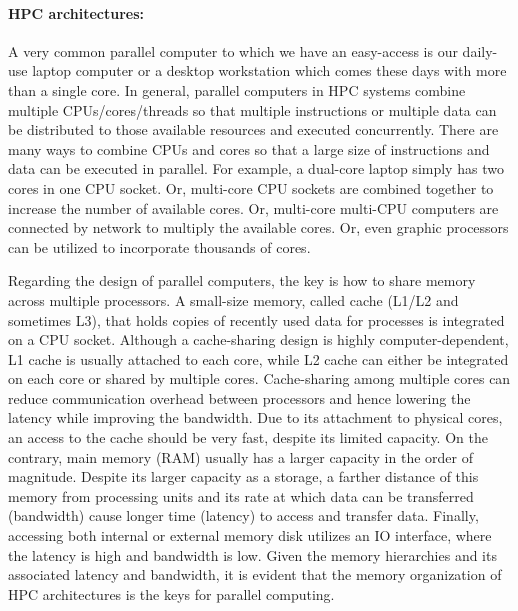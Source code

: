 \documentclass[12pt]{article}
\begin{document}
\paragraph{HPC architectures:} A very common parallel computer to which we have an easy-access is our daily-use laptop computer or a desktop workstation which comes these days with more than a single core. In general, parallel computers in HPC systems combine multiple CPUs/cores/threads so that multiple instructions or multiple data can be distributed to those available resources and executed concurrently. There are many ways to combine CPUs and cores so that a large size of instructions and data can be executed in parallel. For example, a dual-core laptop simply has two cores in one CPU socket. Or, multi-core CPU sockets are combined together to increase the number of available cores. Or, multi-core multi-CPU computers are connected by network to multiply the available cores. Or, even graphic processors can be utilized to incorporate thousands of cores.

Regarding the design of parallel computers, the key is how to share memory across multiple processors. A small-size memory, called cache (L1/L2 and sometimes L3), that holds copies of recently used data for processes is integrated on a CPU socket. Although a cache-sharing design is highly computer-dependent, L1 cache is usually attached to each core, while L2 cache can either be integrated on each core or shared by multiple cores. Cache-sharing among multiple cores can reduce communication overhead between processors and hence lowering the latency while improving the bandwidth. Due to its attachment to physical cores, an access to the cache should be very fast, despite its limited capacity. On the contrary, main memory (RAM) usually has a larger capacity in the order of magnitude. Despite its larger capacity as a storage, a farther distance of this memory from processing units and its rate at which data can be transferred (bandwidth) cause longer time (latency) to access and transfer data. Finally, accessing both internal or external memory disk utilizes an IO interface, where the latency is high and bandwidth is low. Given the memory hierarchies and its associated latency and bandwidth, it is evident that the memory organization of HPC architectures is the keys for parallel computing.
\end{document}
